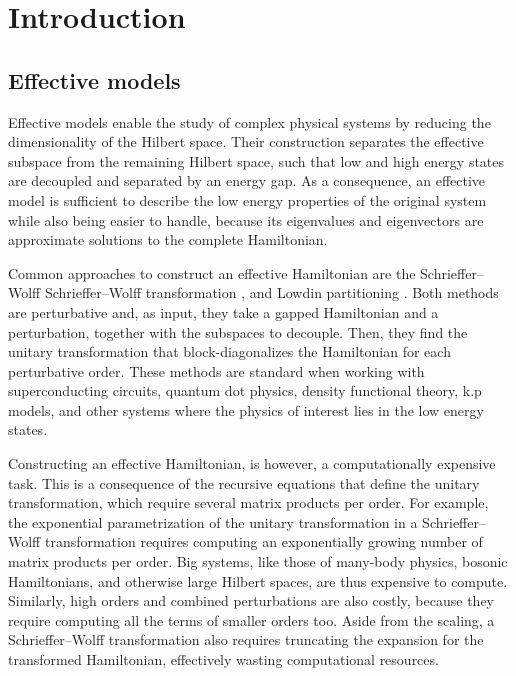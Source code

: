 \section{Introduction}

\subsection{Effective models}

Effective models enable the study of complex physical systems by reducing the
dimensionality of the Hilbert space.
Their construction separates the effective subspace from the remaining Hilbert
space, such that low and high energy states are decoupled and separated by an
energy gap.
As a consequence, an effective model is sufficient to describe the low energy
properties of the original system while also being easier to handle, because
its eigenvalues and eigenvectors are approximate solutions to the complete
Hamiltonian.

Common approaches to construct an effective Hamiltonian are the Schrieffer--Wolff
Schrieffer--Wolff transformation
\cite{Schrieffer_1966}, \cite{Bravyi_2011}
and Lowdin partitioning \cite{White_1950}.
Both methods are perturbative and, as input, they take a gapped Hamiltonian and
a perturbation, together with the subspaces to decouple.
Then, they find the unitary transformation that block-diagonalizes the
Hamiltonian for each perturbative order.
These methods are standard when working with superconducting circuits,
quantum dot physics, density functional theory, k.p models, and other
systems where the physics of interest lies in the low energy states.

Constructing an effective Hamiltonian, is however, a computationally expensive
task.
This is a consequence of the recursive equations that define the unitary
transformation, which require several matrix products per order.
For example, the exponential parametrization of the unitary
transformation in a Schrieffer--Wolff transformation requires computing
an exponentially growing number of matrix products per order.
Big systems, like those of many-body physics, bosonic Hamiltonians, and
otherwise large Hilbert spaces, are thus expensive to compute.
Similarly, high orders and combined perturbations are also costly, because they
require computing all the terms of smaller orders too.
Aside from the scaling, a Schrieffer--Wolff transformation also requires
truncating the expansion for the transformed Hamiltonian, effectively wasting
computational resources.


